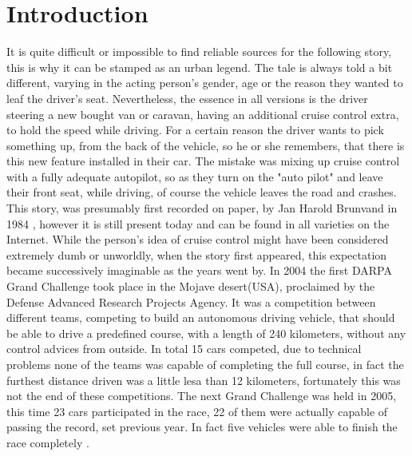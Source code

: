 
\chapter{Introduction}\label{chapter:introduction}

It is quite difficult or impossible to find reliable sources for the following story, this is why it can be stamped as an urban legend. The tale is always told a bit different, varying in the acting person's gender, age or the reason they wanted to leaf the driver's seat. Nevertheless, the essence in all versions is the driver steering a new bought van or caravan, having an additional cruise control extra, to hold the speed while driving. For a certain reason the driver wants to pick something up, from the back of the vehicle, so he or she remembers, that there is this new feature installed in their car. The mistake was mixing up cruise control with a fully adequate autopilot, so as they turn on the "auto pilot" and leave their front seat, while driving, of course the vehicle leaves the road and crashes. \newline
This story, was presumably first recorded on paper, by Jan Harold Brunvand in 1984 \cite{brunvand}, however it is still present today and can be found in all varieties on the Internet. While the person's idea of cruise control might have been considered extremely dumb or unworldly, when the story first appeared, this expectation became successively imaginable as the years went by. \newline
In 2004 the first DARPA Grand Challenge took place \cite{darpa2004} in the Mojave desert(USA), proclaimed by the Defense Advanced Research Projects Agency. It was a competition between different teams, competing to build an autonomous driving vehicle, that should be able to drive a predefined course, with a length of 240 kilometers, without any control advices from outside. In total 15 cars competed, due to technical problems none of the teams was capable of completing the full course, in fact the furthest distance driven was a little lesa than 12 kilometers, fortunately this was not the end of these competitions. \newline
The next Grand Challenge was held in 2005, this time 23 cars participated in the race, 22 of them were actually capable of passing the record, set previous year. In fact five vehicles were able to finish the race completely \cite{darpa2005}.\newline
